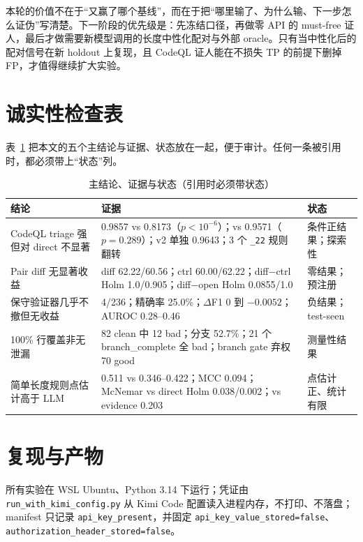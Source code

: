 \documentclass[conference]{IEEEtran}
\begin{document}
本轮的价值不在于“又赢了哪个基线”，而在于把“哪里输了、为什么输、下一步怎么证伪”写清楚。下一阶段的优先级是：先冻结口径，再做零 API 的 must-free 证人，最后才做需要新模型调用的长度中性化配对与外部 oracle。只有当中性化后的配对信号在新 holdout 上复现，且 CodeQL 证人能在不损失 TP 的前提下删掉 FP，才值得继续扩大实验。

\appendices

\section{诚实性检查表}
\label{app:honesty}

表~\ref{tab:honesty} 把本文的五个主结论与证据、状态放在一起，便于审计。任何一条被引用时，都必须带上“状态”列。

\begin{table}[t]
\centering
\caption{主结论、证据与状态（引用时必须带状态）}
\label{tab:honesty}
\footnotesize
\setlength{\tabcolsep}{4pt}
\begin{tabular}{@{}p{4.2cm}p{7.2cm}p{3.2cm}@{}}
\toprule
结论 & 证据 & 状态 \\
\midrule
CodeQL triage 强但对 direct 不显著 & 0.9857 vs 0.8173（$p<10^{-6}$）；vs 0.9571（$p=0.289$）；v2 单独 0.9643；3 个 \texttt{\_22} 规则翻转 & 条件正结果；探索性 \\
Pair diff 无显著收益 & diff 62.22/60.56；ctrl 60.00/62.22；diff$-$ctrl Holm 1.0/0.905；diff$-$open Holm 0.0855/1.0 & 零结果；预注册 \\
保守验证器几乎不撤但无收益 & 4/236；精确率 25.0\%；$\Delta$F1 0 到 $-0.0052$；AUROC 0.28--0.46 & 负结果；test-seen \\
100\% 行覆盖非无泄漏 & 82 clean 中 12 bad；分支 52.7\%；21 个 branch\_complete 全 bad；branch gate 弃权 70 good & 测量性结果 \\
简单长度规则点估计高于 LLM & 0.511 vs 0.346--0.422；MCC 0.094；McNemar vs direct Holm 0.038/0.002；vs evidence 0.203 & 点估计正、统计有限 \\
\bottomrule
\end{tabular}
\end{table}


\section{复现与产物}
\label{app:repro}

所有实验在 WSL Ubuntu、Python 3.14 下运行；凭证由 \texttt{run\_with\_kimi\_config.py} 从 Kimi Code 配置读入进程内存，不打印、不落盘；manifest 只记录 \texttt{api\_key\_present}，并固定 \texttt{api\_key\_value\_stored=false}、\texttt{authorization\_header\_stored=false}。
\end{document}
